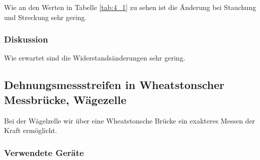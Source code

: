 \documentclass[12pt,a4paper]{article}
\begin{document}
Wie an den Werten in Tabelle \ref{tab:4_1} zu sehen ist die Änderung bei Stauchung und Streckung sehr gering.

\subsubsection*{Diskussion}

Wie erwartet sind die Widerstandsänderungen sehr gering.







\subsection{Dehnungsmessstreifen in Wheatstonscher Messbrücke, Wägezelle}

Bei der Wägelzelle wir über eine Wheatstonsche Brücke ein exakteres Messen der Kraft ermöglicht.

\subsubsection*{Verwendete Geräte}
\end{document}
